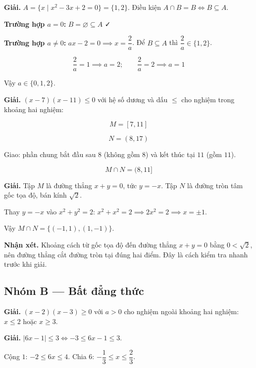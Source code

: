 \documentclass[11pt, a4paper]{article}
\begin{document}
\begin{dapan}[10 — Đáp án A]
\textbf{Giải.} $A = \{x \mid x^2 - 3x + 2 = 0\} = \{1, 2\}$. Điều kiện $A \cap B = B \iff B \subseteq A$.

\textbf{Trường hợp $a = 0$:} $B = \varnothing \subseteq A$ ✓

\textbf{Trường hợp $a \neq 0$:} $ax - 2 = 0 \implies x = \dfrac{2}{a}$. Để $B \subseteq A$ thì $\dfrac{2}{a} \in \{1, 2\}$.

$$\frac{2}{a} = 1 \implies a = 2; \qquad \frac{2}{a} = 2 \implies a = 1$$

Vậy $a \in \{0, 1, 2\}$.
\end{dapan}

\begin{dapan}[11 — Đáp án C]
\textbf{Giải.} $(x-7)(x-11) \le 0$ với hệ số dương và dấu $\le$ cho nghiệm trong khoảng hai nghiệm:

$$M = [7, 11]$$

$$N = (8, 17)$$

Giao: phần chung bắt đầu sau $8$ (không gồm $8$) và kết thúc tại $11$ (gồm $11$).

$$M \cap N = (8, 11]$$
\end{dapan}

\begin{dapan}[12 — Đáp án A]
\textbf{Giải.} Tập $M$ là đường thẳng $x + y = 0$, tức $y = -x$. Tập $N$ là đường tròn tâm gốc tọa độ, bán kính $\sqrt{2}$.

Thay $y = -x$ vào $x^2 + y^2 = 2$: $x^2 + x^2 = 2 \implies 2x^2 = 2 \implies x = \pm 1$.

Vậy $M \cap N = \{(-1, 1), (1, -1)\}$.

\textbf{Nhận xét.} Khoảng cách từ gốc tọa độ đến đường thẳng $x + y = 0$ bằng $0 < \sqrt{2}$, nên đường thẳng cắt đường tròn tại đúng hai điểm. Đây là cách kiểm tra nhanh trước khi giải.
\end{dapan}

\subsection*{Nhóm B — Bất đẳng thức}

\begin{dapan}[13 — Đáp án C]
\textbf{Giải.} $(x-2)(x-3) \ge 0$ với $a > 0$ cho nghiệm ngoài khoảng hai nghiệm: $x \le 2$ hoặc $x \ge 3$.
\end{dapan}

\begin{dapan}[14 — Đáp án D]
\textbf{Giải.} $|6x - 1| \le 3 \iff -3 \le 6x - 1 \le 3$.

Cộng $1$: $-2 \le 6x \le 4$. Chia $6$: $-\dfrac{1}{3} \le x \le \dfrac{2}{3}$.
\end{dapan}
\end{document}
